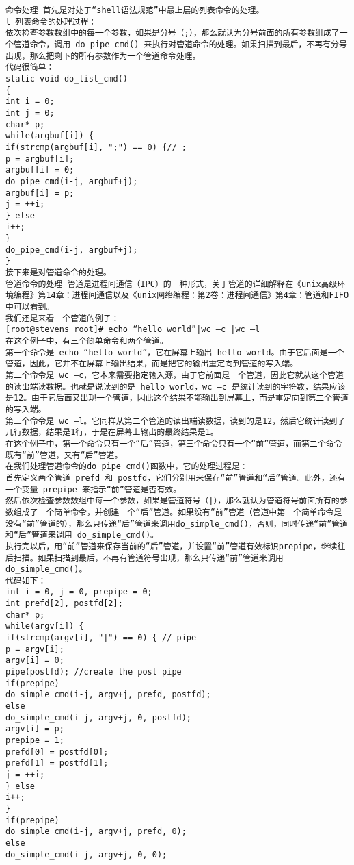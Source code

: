 \begin{lstlisting}
命令处理 首先是对处于“shell语法规范”中最上层的列表命令的处理。 
l 列表命令的处理过程： 
依次检查参数数组中的每一个参数，如果是分号（;），那么就认为分号前面的所有参数组成了一个管道命令，调用 do_pipe_cmd() 来执行对管道命令的处理。如果扫描到最后，不再有分号出现，那么把剩下的所有参数作为一个管道命令处理。 
代码很简单： 
static void do_list_cmd() 
{ 
int i = 0; 
int j = 0; 
char* p; 
while(argbuf[i]) { 
if(strcmp(argbuf[i], ";") == 0) {// ; 
p = argbuf[i]; 
argbuf[i] = 0; 
do_pipe_cmd(i-j, argbuf+j); 
argbuf[i] = p; 
j = ++i; 
} else 
i++; 
} 
do_pipe_cmd(i-j, argbuf+j); 
} 
接下来是对管道命令的处理。 
管道命令的处理 管道是进程间通信（IPC）的一种形式，关于管道的详细解释在《unix高级环境编程》第14章：进程间通信以及《unix网络编程：第2卷：进程间通信》第4章：管道和FIFO中可以看到。 
我们还是来看一个管道的例子： 
[root@stevens root]# echo “hello world”|wc –c |wc –l 
在这个例子中，有三个简单命令和两个管道。 
第一个命令是 echo “hello world”，它在屏幕上输出 hello world。由于它后面是一个管道，因此，它并不在屏幕上输出结果，而是把它的输出重定向到管道的写入端。 
第二个命令是 wc –c，它本来需要指定输入源，由于它前面是一个管道，因此它就从这个管道的读出端读数据。也就是说读到的是 hello world，wc –c 是统计读到的字符数，结果应该是12。由于它后面又出现一个管道，因此这个结果不能输出到屏幕上，而是重定向到第二个管道的写入端。 
第三个命令是 wc –l。它同样从第二个管道的读出端读数据，读到的是12，然后它统计读到了几行数据，结果是1行，于是在屏幕上输出的最终结果是1。 
在这个例子中，第一个命令只有一个“后”管道，第三个命令只有一个“前”管道，而第二个命令既有“前”管道，又有“后”管道。 
在我们处理管道命令的do_pipe_cmd()函数中，它的处理过程是： 
首先定义两个管道 prefd 和 postfd，它们分别用来保存“前”管道和“后”管道。此外，还有一个变量 prepipe 来指示“前”管道是否有效。 
然后依次检查参数数组中每一个参数，如果是管道符号（|），那么就认为管道符号前面所有的参数组成了一个简单命令，并创建一个“后”管道。如果没有“前”管道（管道中第一个简单命令是没有“前”管道的），那么只传递“后”管道来调用do_simple_cmd()，否则，同时传递“前”管道和“后”管道来调用 do_simple_cmd()。 
执行完以后，用“前”管道来保存当前的“后”管道，并设置“前”管道有效标识prepipe，继续往后扫描。如果扫描到最后，不再有管道符号出现，那么只传递“前”管道来调用do_simple_cmd()。 
代码如下： 
int i = 0, j = 0, prepipe = 0; 
int prefd[2], postfd[2]; 
char* p; 
while(argv[i]) { 
if(strcmp(argv[i], "|") == 0) { // pipe 
p = argv[i]; 
argv[i] = 0; 
pipe(postfd); //create the post pipe 
if(prepipe) 
do_simple_cmd(i-j, argv+j, prefd, postfd); 
else 
do_simple_cmd(i-j, argv+j, 0, postfd); 
argv[i] = p; 
prepipe = 1; 
prefd[0] = postfd[0]; 
prefd[1] = postfd[1]; 
j = ++i; 
} else 
i++; 
} 
if(prepipe) 
do_simple_cmd(i-j, argv+j, prefd, 0); 
else 
do_simple_cmd(i-j, argv+j, 0, 0); 




\end{lstlisting}
